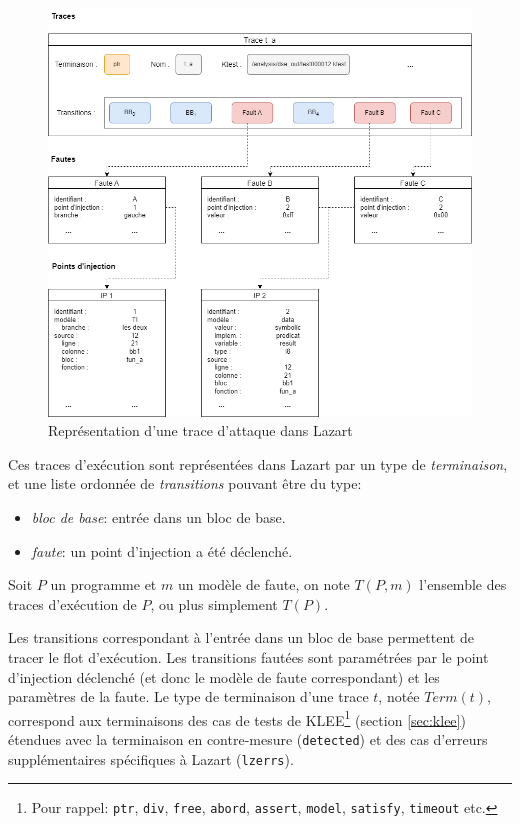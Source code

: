             \begin{figure}[t]\centering
              \includegraphics[scale=.43]{ch3-lazart/img/trace-model.drawio.png}
              \caption{Représentation d'une trace d'attaque dans Lazart \label{fig:lz-trace-model}}
            \end{figure}
            
            Ces traces d'exécution sont représentées dans Lazart par un type de \textit{terminaison}, et une liste ordonnée de \textit{transitions} pouvant être du type: 
            \begin{itemize}
                \item \textit{bloc de base}: entrée dans un bloc de base.
                \item \textit{faute}: un point d'injection a été déclenché.
            \end{itemize}
            
            \begin{defi}
                Soit $P$ un programme et $m$ un modèle de faute, on note $T(P, m)$ l'ensemble des traces d'exécution de $P$, ou plus simplement $T(P)$.
            \end{defi}
            
            Les transitions correspondant à l'entrée dans un bloc de base permettent de tracer le flot d'exécution. 
            Les transitions fautées sont paramétrées par le point d'injection déclenché (et donc le modèle de faute correspondant) et les paramètres de la faute. 
            Le type de terminaison d'une trace $t$, notée $Term(t)$, correspond aux terminaisons des cas de tests de KLEE\footnote{Pour rappel: \texttt{ptr}, \texttt{div}, \texttt{free}, \texttt{abord}, \texttt{assert}, \texttt{model}, \texttt{satisfy}, \texttt{timeout} etc.} (section \ref{sec:klee}) étendues avec la terminaison en contre-mesure (\texttt{detected}) et des cas d'erreurs supplémentaires spécifiques à Lazart (\texttt{lzerrs}).
            
